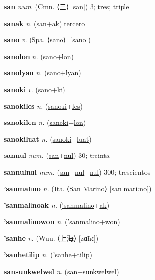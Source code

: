 \textbf{\hypertarget{san}{san}} \textit{num.} (Cmn. ⟨{\chinese{}三}⟩ [san])
3; tres; triple

\textbf{\hypertarget{sanak}{sanak}} \textit{n.} (\hyperlink{san}{san}+\allowbreak \hyperlink{ak}{ak})
tercero

\textbf{\hypertarget{sano}{sano}} \textit{v.} (Spa. ⟨sano⟩ [ˈsano])


\textbf{\hypertarget{sanolon}{sanolon}} \textit{n.} (\hyperlink{sano}{sano}+\allowbreak \hyperlink{lon}{lon})


\textbf{\hypertarget{sanolyan}{sanolyan}} \textit{n.} (\hyperlink{sano}{sano}+\allowbreak \hyperlink{lyan}{lyan})


\textbf{\hypertarget{sanoki}{sanoki}} \textit{v.} (\hyperlink{sano}{sano}+\allowbreak \hyperlink{ki}{ki})


\textbf{\hypertarget{sanokiles}{sanokiles}} \textit{n.} (\hyperlink{sanoki}{sanoki}+\allowbreak \hyperlink{les}{les})


\textbf{\hypertarget{sanokilon}{sanokilon}} \textit{n.} (\hyperlink{sanoki}{sanoki}+\allowbreak \hyperlink{lon}{lon})


\textbf{\hypertarget{sanokiluat}{sanokiluat}} \textit{n.} (\hyperlink{sanoki}{sanoki}+\allowbreak \hyperlink{luat}{luat})


\textbf{\hypertarget{sannul}{sannul}} \textit{num.} (\hyperlink{san}{san}+\allowbreak \hyperlink{nul}{nul})
30; treinta

\textbf{\hypertarget{sannulnul}{sannulnul}} \textit{num.} (\hyperlink{san}{san}+\allowbreak \hyperlink{nul}{nul}+\allowbreak \hyperlink{nul}{nul})
300; trescientos

\textbf{\hypertarget{'sanmalino}{'sanmalino}} \textit{n.} (Ita. ⟨San Marino⟩ [san mariːno])


\textbf{\hypertarget{'sanmalinoak}{'sanmalinoak}} \textit{n.} (\hyperlink{'sanmalino}{'sanmalino}+\allowbreak \hyperlink{ak}{ak})


\textbf{\hypertarget{'sanmalinowon}{'sanmalinowon}} \textit{n.} (\hyperlink{'sanmalino}{'sanmalino}+\allowbreak \hyperlink{won}{won})


\textbf{\hypertarget{'sanhe}{'sanhe}} \textit{n.} (Wuu. ⟨{\chinese{}上海}⟩ [zɑ̃hɛ])


\textbf{\hypertarget{'sanhetilip}{'sanhetilip}} \textit{n.} (\hyperlink{'sanhe}{'sanhe}+\allowbreak \hyperlink{tilip}{tilip})


\textbf{\hypertarget{sansunkwelwel}{sansunkwelwel}} \textit{n.} (\hyperlink{san}{san}+\allowbreak \hyperlink{sunkwelwel}{sunkwelwel})


